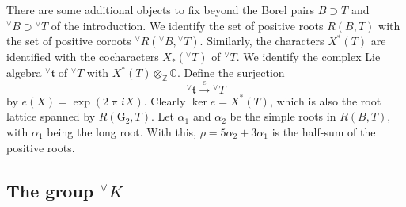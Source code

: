\documentclass[a4paper, 11pt]{article}
\begin{document}
  
There are some additional objects to fix beyond the Borel pairs
$B \supset T$ and 
${^\vee}B \supset {^\vee}T$ of the introduction.
We identify the set of
positive roots $R(B,T)$ with the set of positive coroots
${^\vee}R({^\vee}B, {^\vee}T)$.  Similarly, the characters $X^{*}(T)$
are identified with the cocharacters $X_{*}({^\vee}T)$ of ${^\vee}T$.
We identify the complex Lie algebra
${^\vee}\mathfrak{t}$ of ${^\vee}T$ with $X^{*}(T) \otimes_{\mathbb{Z}}
\mathbb{C}$.  Define
the surjection
\begin{equation}
\label{emap}
{^\vee}\mathfrak{t} \stackrel{e}{\rightarrow} {^\vee}T
\end{equation}
by $e(X) = \exp(2 \uppi i X)$.  Clearly $\ker e = X^{*}(T)$, which is
also the root lattice spanned by $R(\mathrm{G}_{2},T)$.  
Let $\alpha_{1}$ and $\alpha_{2}$ be the simple roots in $R(B,T)$, with
$\alpha_{1}$ being the long root.  With this, $\rho = 5\alpha_{2} +
3\alpha_{1}$ is the half-sum of the positive roots.




  

\subsection{The group ${^\vee}K$}
\label{groupK}
\end{document}
